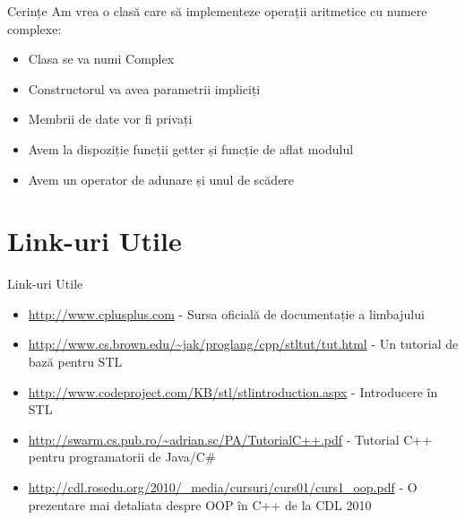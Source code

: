 \documentclass{beamer}
\begin{document}
    \begin{frame}{Cerințe}
    Am vrea o clasă care să implementeze operații aritmetice cu numere complexe: \pause
    \begin{itemize}
    \setlength{\itemsep}{0.6cm}
    \item Clasa se va numi Complex \pause
    \item Constructorul va avea parametrii impliciți \pause
    \item Membrii de date vor fi privați \pause
    \item Avem la dispoziție funcții getter și funcție de aflat modulul \pause
    \item Avem un operator de adunare și unul de scădere
    \end{itemize}
    \end{frame}

\section{Link-uri Utile}
    \frame{\tableofcontents[currentsection]}

    \begin{frame}{Link-uri Utile}
    \begin{itemize}
    \setlength{\itemsep}{0.5cm}
    \footnotesize
    \item \url{http://www.cplusplus.com}{ - Sursa oficială de documentație a limbajului}
    \item \url{http://www.cs.brown.edu/\~jak/proglang/cpp/stltut/tut.html}{ - Un tutorial de bază pentru STL}
    \item \url{http://www.codeproject.com/KB/stl/stlintroduction.aspx}{ - Introducere în STL}
    \item \url{http://swarm.cs.pub.ro/~adrian.sc/PA/TutorialC++.pdf}{ - Tutorial C++ pentru programatorii de Java/C\#}
    \item \url{http://cdl.rosedu.org/2010/_media/cursuri/curs01/curs1_oop.pdf}{ - O prezentare mai detaliata despre OOP în C++ de la CDL 2010}
    \normalfont
    \end{itemize}
    \end{frame}
\end{document}
